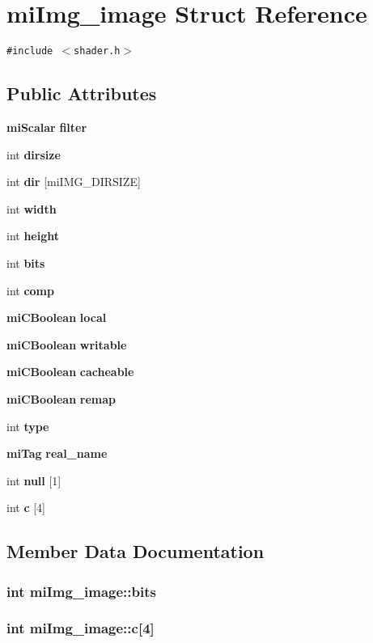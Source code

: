 \section{mi\-Img\_\-image Struct Reference}
\label{structmiImg__image}
{\tt \#include $<$shader.h$>$}

\subsection*{Public Attributes}
\begin{CompactItemize}
\item 
{\bf mi\-Scalar} {\bf filter}
\item 
int {\bf dirsize}
\item 
int {\bf dir} [mi\-IMG\_\-DIRSIZE]
\item 
int {\bf width}
\item 
int {\bf height}
\item 
int {\bf bits}
\item 
int {\bf comp}
\item 
{\bf mi\-CBoolean} {\bf local}
\item 
{\bf mi\-CBoolean} {\bf writable}
\item 
{\bf mi\-CBoolean} {\bf cacheable}
\item 
{\bf mi\-CBoolean} {\bf remap}
\item 
int {\bf type}
\item 
{\bf mi\-Tag} {\bf real\_\-name}
\item 
int {\bf null} [1]
\item 
int {\bf c} [4]
\end{CompactItemize}


\subsection{Member Data Documentation}
\subsubsection{\setlength{\rightskip}{0pt plus 5cm}int {\bf mi\-Img\_\-image::bits}}\label{structmiImg__image_o5}


\subsubsection{\setlength{\rightskip}{0pt plus 5cm}int {\bf mi\-Img\_\-image::c}[4]}\label{structmiImg__image_o14}


